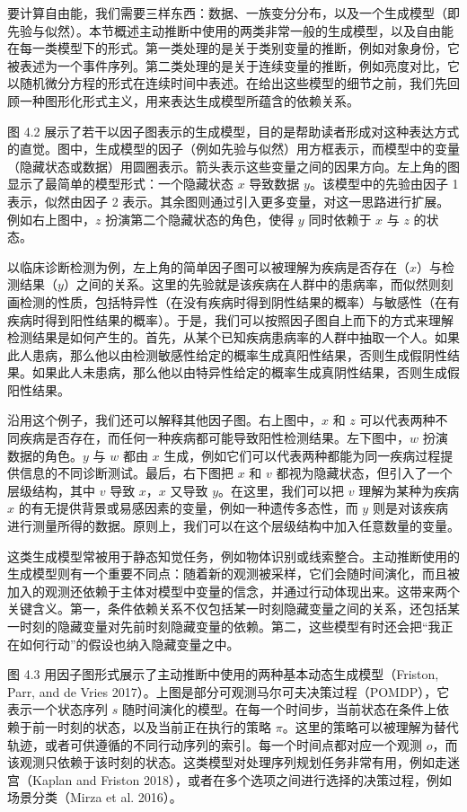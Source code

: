 要计算自由能，我们需要三样东西：数据、一族变分分布，以及一个生成模型（即先验与似然）。本节概述主动推断中使用的两类非常一般的生成模型，以及自由能在每一类模型下的形式。第一类处理的是关于类别变量的推断，例如对象身份，它被表述为一个事件序列。第二类处理的是关于连续变量的推断，例如亮度对比，它以随机微分方程的形式在连续时间中表述。在给出这些模型的细节之前，我们先回顾一种图形化形式主义，用来表达生成模型所蕴含的依赖关系。

图 4.2 展示了若干以因子图表示的生成模型，目的是帮助读者形成对这种表达方式的直觉。图中，生成模型的因子（例如先验与似然）用方框表示，而模型中的变量（隐藏状态或数据）用圆圈表示。箭头表示这些变量之间的因果方向。左上角的图显示了最简单的模型形式：一个隐藏状态 $x$ 导致数据 $y$。该模型中的先验由因子 1 表示，似然由因子 2 表示。其余图则通过引入更多变量，对这一思路进行扩展。例如右上图中，$z$ 扮演第二个隐藏状态的角色，使得 $y$ 同时依赖于 $x$ 与 $z$ 的状态。

以临床诊断检测为例，左上角的简单因子图可以被理解为疾病是否存在（$x$）与检测结果（$y$）之间的关系。这里的先验就是该疾病在人群中的患病率，而似然则刻画检测的性质，包括特异性（在没有疾病时得到阴性结果的概率）与敏感性（在有疾病时得到阳性结果的概率）。于是，我们可以按照因子图自上而下的方式来理解检测结果是如何产生的。首先，从某个已知疾病患病率的人群中抽取一个人。如果此人患病，那么他以由检测敏感性给定的概率生成真阳性结果，否则生成假阴性结果。如果此人未患病，那么他以由特异性给定的概率生成真阴性结果，否则生成假阳性结果。

沿用这个例子，我们还可以解释其他因子图。右上图中，$x$ 和 $z$ 可以代表两种不同疾病是否存在，而任何一种疾病都可能导致阳性检测结果。左下图中，$w$ 扮演数据的角色。$y$ 与 $w$ 都由 $x$ 生成，例如它们可以代表两种都能为同一疾病过程提供信息的不同诊断测试。最后，右下图把 $x$ 和 $v$ 都视为隐藏状态，但引入了一个层级结构，其中 $v$ 导致 $x$，$x$ 又导致 $y$。在这里，我们可以把 $v$ 理解为某种为疾病 $x$ 的有无提供背景或易感因素的变量，例如一种遗传多态性，而 $y$ 则是对该疾病进行测量所得的数据。原则上，我们可以在这个层级结构中加入任意数量的变量。

这类生成模型常被用于静态知觉任务，例如物体识别或线索整合。主动推断使用的生成模型则有一个重要不同点：随着新的观测被采样，它们会随时间演化，而且被加入的观测还依赖于主体对模型中变量的信念，并通过行动体现出来。这带来两个关键含义。第一，条件依赖关系不仅包括某一时刻隐藏变量之间的关系，还包括某一时刻的隐藏变量对先前时刻隐藏变量的依赖。第二，这些模型有时还会把“我正在如何行动”的假设也纳入隐藏变量之中。

图 4.3 用因子图形式展示了主动推断中使用的两种基本动态生成模型（Friston, Parr, and de Vries 2017）。上图是部分可观测马尔可夫决策过程（POMDP），它表示一个状态序列 $s$ 随时间演化的模型。在每一个时间步，当前状态在条件上依赖于前一时刻的状态，以及当前正在执行的策略 $\pi$。这里的策略可以被理解为替代轨迹，或者可供遵循的不同行动序列的索引。每一个时间点都对应一个观测 $o$，而该观测只依赖于该时刻的状态。这类模型对处理序列规划任务非常有用，例如走迷宫（Kaplan and Friston 2018），或者在多个选项之间进行选择的决策过程，例如场景分类（Mirza et al. 2016）。


